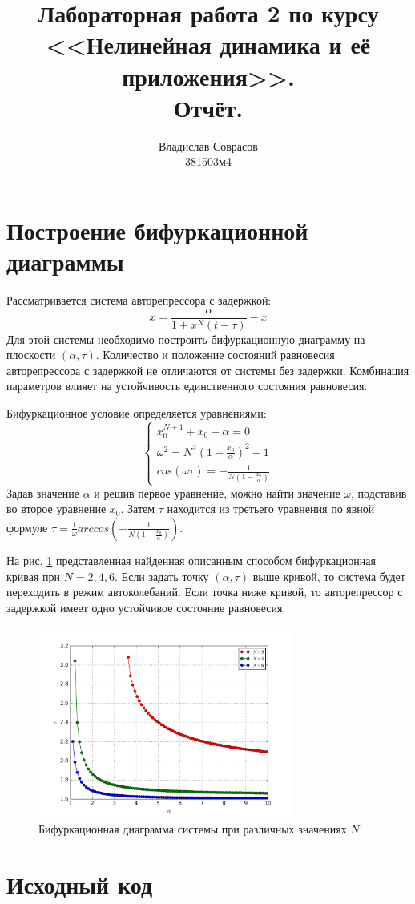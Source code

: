 \documentclass[a4paper]{article}
\begin{document}
\title{Лабораторная работа 2 по курсу <<Нелинейная динамика и её приложения>>. \\Отчёт.}
\author{Владислав Соврасов\\ 381503м4}
\date{}
\maketitle

\section{Построение бифуркационной диаграммы}
Рассматривается система авторепрессора с задержкой:
\begin{displaymath}
  \dot x = \frac{\alpha}{1+x^N(t-\tau)} - x
\end{displaymath}
Для этой системы необходимо построить бифуркационную диаграмму на плоскости
\((\alpha,\tau)\). Количество и положение состояний равновесия авторепрессора с
задержкой не отличаются от системы без задержки. Комбинация параметров влияет
на устойчивость единственного состояния равновесия.

Бифуркационное условие определяется уравнениями:
\begin{displaymath}
	\left\{
  \begin{array}{lr}
    x_0^{N+1}+x_0-\alpha = 0 \\
    \omega^2=N^2(1-\frac{x_0}{\alpha})^2-1 \\
    cos(\omega \tau)=-\frac{1}{N(1-\frac{x_0}{\alpha})}
  \end{array}
\right.
\end{displaymath}
Задав значение \(\alpha\) и решив первое уравнение, можно найти значение \(\omega\),
подставив во второе уравнение \(x_0\). Затем \(\tau\) находится из третьего
уравнения по явной формуле \(\tau = \frac{1}{\omega}arccos(-\frac{1}{N(1-\frac{x_0}{\alpha})})\).

На рис. \ref{fig:diagram} представленная найденная описанным способом бифуркационная
кривая при \(N=2,4,6\). Если задать точку \((\alpha,\tau)\) выше кривой, то система
будет переходить в режим автоколебаний. Если точка ниже кривой, то авторепрессор с
задержкой имеет одно устойчивое состояние равновесия.
\begin{figure}[H]
	\center
  \includegraphics[width=0.75\textwidth]{../pictures/lab2_diagram.png}
  \caption{Бифуркационная диаграмма системы при различных значениях \(N\)}
  \label{fig:diagram}
\end{figure}


\section{Исходный код}


\end{document}
